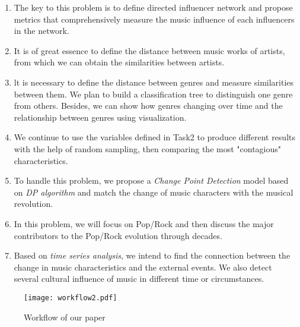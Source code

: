 \documentclass[12pt]{article}  %
\begin{document}
	\begin{enumerate}[\bfseries 1.]
		\setlength{\parsep}{0ex} %
		\setlength{\topsep}{2ex} %
		\setlength{\itemsep}{1ex} %
		\item The key to this problem is to define directed influencer network and propose metrics that comprehensively measure the music influence of each influencers in the network.
		\item It is of great essence to define the distance between music works of artists, from which we can obtain the similarities between artists.
		\item lt is necessary to define the distance between genres and measure similarities between them. We plan to build a classification tree to distinguish one genre from others. Besides, we can show how genres changing over time and the relationship between genres using visualization.
		\item We continue to use the variables defined in Task2 to produce different results with the help of random sampling, then comparing the most "contagious" characteristics.
		\item To handle this problem, we propose a \textit{Change Point Detection} model based on \textit{DP algorithm} and match the change of music characters with the musical revolution.
		\item In this problem, we will focus on Pop/Rock and then discuss the major contributors to the Pop/Rock evolution through decades.
		\item Based on \textit{time series analysis}, we intend to find the connection between the change in music characteristics and the external events. We also detect several cultural influence of music in different time or circumstances.
		
	\end{enumerate}
	
	\begin{figure}[htbp]
		\centering
		\texttt{[image: workflow2.pdf]} 	%
		\caption{Workflow of our paper}		%
		\label{fig:exam_network}							%
	\end{figure}
	
\end{document}

